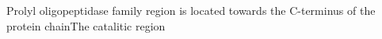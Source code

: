 Prolyl oligopeptidase family region is located towards the C-terminus of the protein chainThe catalitic region 